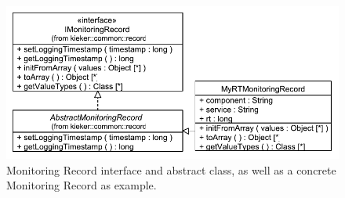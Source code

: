 \begin{figure}
\centering
\includegraphics[scale=0.65]{figures/model/kieker_MyRTMonitoringRecord}%
\caption{Monitoring Record interface and abstract class, as well as a concrete Monitoring Record as example.}
\label{fig:kieker:coreFrameworkClassesAndInterfaces:record}
\end{figure}



